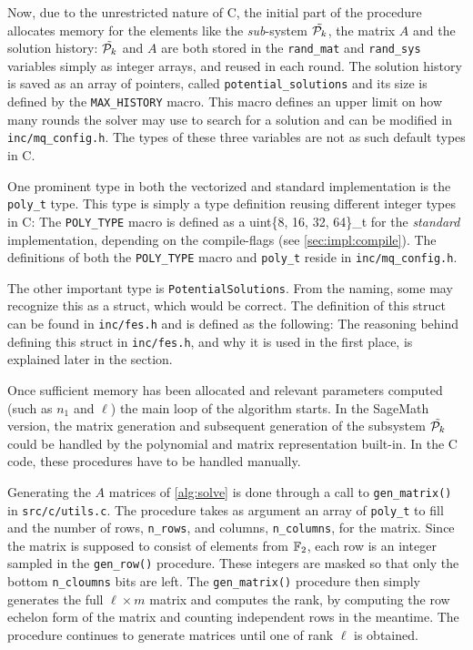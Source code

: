 Now, due to the unrestricted nature of C, the initial part of the procedure allocates memory for the elements like the \textit{sub}-system $\Tilde{\mathcal{P}_k}$, the matrix $A$ and the solution history:
$\Tilde{\mathcal{P}_k}$ and $A$ are both stored in the \texttt{rand\_mat} and \texttt{rand\_sys} variables simply as integer arrays, and reused in each round. The solution history is saved as an array of pointers, called \texttt{potential\_solutions} and its size is defined by the \texttt{MAX\_HISTORY} macro. This macro defines an upper limit on how many rounds the solver may use to search for a solution and can be modified in \texttt{inc/mq\_config.h}. The types of these three variables are not as such default types in C.

One prominent type in both the vectorized and standard implementation is the \texttt{poly\_t} type. This type is simply a type definition reusing different integer types in C:
The \texttt{POLY\_TYPE} macro is defined as a uint\{8, 16, 32, 64\}\_t for the \textit{standard} implementation, depending on the compile-flags (see \cref{sec:impl:compile}). The definitions of both the \texttt{POLY\_TYPE} macro and \texttt{poly\_t} reside in \texttt{inc/mq\_config.h}.

The other important type is \texttt{PotentialSolutions}. From the naming, some may recognize this as a struct, which would be correct. The definition of this struct can be found in \texttt{inc/fes.h} and is defined as the following:
The reasoning behind defining this struct in \texttt{inc/fes.h}, and why it is used in the first place, is explained later in the section.

Once sufficient memory has been allocated and relevant parameters computed (such as $n_1$ and $\ell$) the main loop of the algorithm starts. In the SageMath version, the matrix generation and subsequent generation of the subsystem $\Tilde{\mathcal{P}_k}$ could be handled by the polynomial and matrix representation built-in. In the C code, these procedures have to be handled manually. 

Generating the $A$ matrices of \cref{alg:solve} is done through a call to \texttt{gen\_matrix()} in \texttt{src/c/utils.c}. The procedure takes as argument an array of \texttt{poly\_t} to fill and the number of rows, \texttt{n\_rows}, and columns, \texttt{n\_columns}, for the matrix. Since the matrix is supposed to consist of elements from $\mathbb{F}_2$, each row is an integer sampled in the \texttt{gen\_row()} procedure. These integers are masked so that only the bottom \texttt{n\_cloumns} bits are left. The \texttt{gen\_matrix()} procedure then simply generates the full $\ell \times m$ matrix and computes the rank, by computing the row echelon form of the matrix and counting independent rows in the meantime. The procedure continues to generate matrices until one of rank $\ell$ is obtained.

